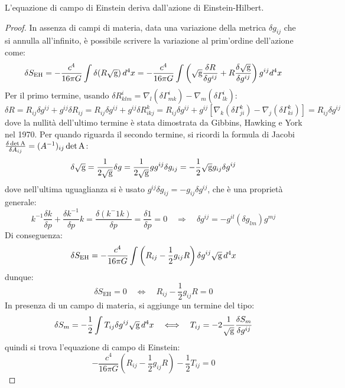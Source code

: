 \begin{proposition}
	L'equazione di campo di Einstein deriva dall'azione di Einstein-Hilbert.
\end{proposition}
\begin{proof}
	In assenza di campi di materia, data una variazione della metrica $ \delta g_{ij} $ che si annulla all'infinito, è possibile scrivere la variazione al prim'ordine dell'azione come:
	\begin{equation*}
		\delta S_{\text{EH}} = - \frac{c^4}{16\pi G} \int \delta (R\sqrt{\mathbf{\text{g}}}) \,d^4x = - \frac{c^4}{16\pi G} \int \left( \sqrt{\mathbf{\text{g}}} \frac{\delta R}{\delta g^{ij}} + R \frac{\delta \sqrt{\mathbf{\text{g}}}}{\delta g^{ij}} \right) g^{ij} d^4x
	\end{equation*}
	Per il primo termine, usando $ \delta R^i_{klm} = \nabla_l (\delta \Gamma^i_{mk}) - \nabla_m (\delta \Gamma^i_{lk}) $:
	\begin{equation*}
		\delta R = R_{ij} \delta g^{ij} + g^{ij} \delta R_{ij} = R_{ij} \delta g^{ij} + g^{ij} \delta R^k_{ikj} = R_{ij} \delta g^{ij} + g^{ij} \left[ \nabla_k (\delta \Gamma^k_{ji}) - \nabla_j (\delta \Gamma^k_{ki}) \right] = R_{ij} \delta g^{ij}
	\end{equation*}
	dove la nullità dell'ultimo termine è stata dimostrata da Gibbins, Hawking e York nel 1970. Per quando riguarda il secondo termine, si ricordi la formula di Jacobi $ \frac{\delta \det \mathbf{\text{A}}}{\delta A_{ij}} = (A^{-1})_{ij} \det \mathbf{\text{A}} $:
	\begin{equation*}
		\delta \sqrt{\mathbf{\text{g}}} = \frac{1}{2\sqrt{\mathbf{\text{g}}}} \delta g = \frac{1}{2\sqrt{\mathbf{\text{g}}}} g g^{ij} \delta g_{ij} = - \frac{1}{2} \sqrt{\mathbf{\text{g}}} g_{ij} \delta g^{ij}
	\end{equation*}
	dove nell'ultima uguaglianza si è usato $ g^{ij} \delta g_{ij} = - g_{ij} \delta g^{ij} $, che è una proprietà generale:
	\begin{equation*}
		k^{-1} \frac{\delta k}{\delta p} + \frac{\delta k^{-1}}{\delta p} k = \frac{\delta (k^-1 k)}{\delta p} = \frac{\delta 1}{\delta p} = 0 \quad\Longrightarrow\quad \delta g^{ij} = - g^{il} (\delta g_{lm}) g^{mj}
	\end{equation*}
	Di conseguenza:
	\begin{equation*}
		\delta S_{\text{EH}} = - \frac{c^4}{16\pi G} \int \left( R_{ij} - \frac{1}{2} g_{ij} R \right) \delta g^{ij} \sqrt{\mathbf{\text{g}}} \,d^4x
	\end{equation*}
	dunque:
	\begin{equation*}
		\delta S_{\text{EH}} = 0 \quad\Longleftrightarrow\quad R_{ij} - \frac{1}{2} g_{ij} R = 0
	\end{equation*}
	In presenza di un campo di materia, si aggiunge un termine del tipo:
	\begin{equation*}
		\delta S_m = - \frac{1}{2} \int T_{ij} \delta g^{ij} \sqrt{\mathbf{\text{g}}} \,d^4x \quad\Longleftrightarrow\quad T_{ij} = - 2 \frac{1}{\sqrt{\mathbf{\text{g}}}} \frac{\delta S_m}{\delta g^{ij}}
	\end{equation*}
	quindi si trova l'equazione di campo di Einstein:
	\begin{equation*}
		- \frac{c^4}{16\pi G} \left( R_{ij} - \frac{1}{2} g_{ij} R \right) - \frac{1}{2} T_{ij} = 0
	\end{equation*}
\end{proof}










